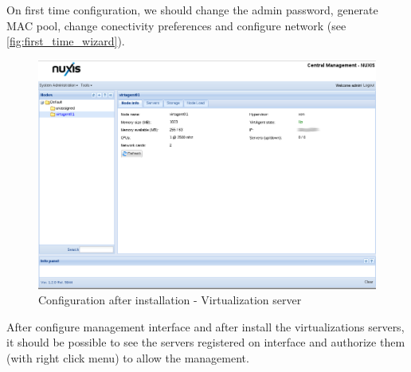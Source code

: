 On first time configuration, we should change the admin password, generate MAC pool, change conectivity preferences and configure network (see \ref{fig:first_time_wizard}).

\begin{figure}[H]
	\begin{center}
    \includegraphics[scale=0.4]{screenshots/install/nuxis/nuxis_enterprise_wiz_install_28.png}
    \caption{Configuration after installation - Virtualization server}
	\label{fig:installation_enterprise_wiz_02}
	\end{center}
\end{figure}

After configure management interface and after install the virtualizations servers, it should be possible to see the servers registered on interface and authorize them (with right click menu) to allow the management.

\pagebreak
